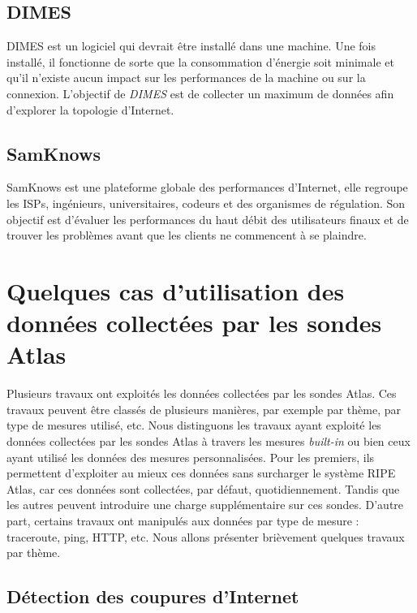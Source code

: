\subsection{DIMES}
DIMES \cite{Shavitt:2005:DLI:1096536.1096546} est un logiciel qui devrait être installé dans une machine. Une fois installé, il fonctionne de sorte que la consommation d'énergie soit minimale et qu'il n'existe aucun impact sur les performances de la machine ou sur la connexion. L'objectif de \textit{DIMES} est de collecter un maximum de données afin d'explorer la topologie d'Internet.


\subsection{SamKnows}
SamKnows \cite{SamKnows}  est une plateforme globale des performances d'Internet, elle regroupe les ISPs, ingénieurs, universitaires, codeurs et des organismes de régulation. Son objectif est d'évaluer les performances du haut débit des utilisateurs finaux et de trouver les problèmes avant que les clients ne commencent à se plaindre. 

\section{Quelques cas d'utilisation des données collectées par les sondes Atlas} \label{use-cases-atlas}


Plusieurs travaux ont exploités les données collectées par les sondes Atlas. Ces travaux peuvent être classés de plusieurs manières, par exemple  par thème,  par  type de mesures utilisé, etc. Nous distinguons les travaux ayant exploité les données collectées par les sondes Atlas à travers les mesures \textit{built-in} ou bien ceux ayant utilisé les données des mesures personnalisées.  Pour les premiers, ils permettent d'exploiter au mieux ces données sans surcharger le système RIPE Atlas, car ces données sont collectées, par défaut, quotidiennement. Tandis que les autres peuvent introduire une charge supplémentaire sur ces sondes. D'autre part, certains travaux  ont manipulés  aux données par  type de mesure : traceroute, ping,  HTTP, etc. Nous allons présenter brièvement quelques travaux par thème.

\subsection{Détection des coupures d'Internet}

